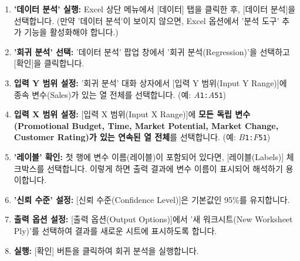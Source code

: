 \documentclass[11pt,a4paper]{article}
\theoremstyle{definition}
\begin{document}
\begin{tcolorbox}[title=\textbf{Excel 데이터 분석 도구 사용하기}]
\begin{enumerate}
    \item \textbf{'데이터 분석' 실행:} Excel 상단 메뉴에서 [데이터] 탭을 클릭한 후, [데이터 분석]을 선택합니다. (만약 '데이터 분석'이 보이지 않으면, Excel 옵션에서 '분석 도구' 추가 기능을 활성화해야 합니다.)
    \item \textbf{'회귀 분석' 선택:} '데이터 분석' 팝업 창에서 '회귀 분석(Regression)'을 선택하고 [확인]을 클릭합니다.
    \item \textbf{입력 Y 범위 설정:} '회귀 분석' 대화 상자에서 [입력 Y 범위(Input Y Range)]에 종속 변수(Sales)가 있는 열 전체를 선택합니다. (예: \texttt{$A$1:$A$51})
    \item \textbf{입력 X 범위 설정:} [입력 X 범위(Input X Range)]에 \textbf{모든 독립 변수(Promotional Budget, Time, Market Potential, Market Change, Customer Rating)가 있는 연속된 열 전체}를 선택합니다. (예: \texttt{$B$1:$F$51})
    \item \textbf{'레이블' 확인:} 첫 행에 변수 이름(레이블)이 포함되어 있다면, [레이블(Labels)] 체크박스를 선택합니다. 이렇게 하면 출력 결과에 변수 이름이 표시되어 해석하기 용이합니다.
    \item \textbf{'신뢰 수준' 설정:} [신뢰 수준(Confidence Level)]은 기본값인 95\%를 유지합니다.
    \item \textbf{출력 옵션 설정:} [출력 옵션(Output Options)]에서 '새 워크시트(New Worksheet Ply)'를 선택하여 결과를 새로운 시트에 표시하도록 합니다.
    \item \textbf{실행:} [확인] 버튼을 클릭하여 회귀 분석을 실행합니다.
\end{enumerate}
\end{tcolorbox}
\end{document}
